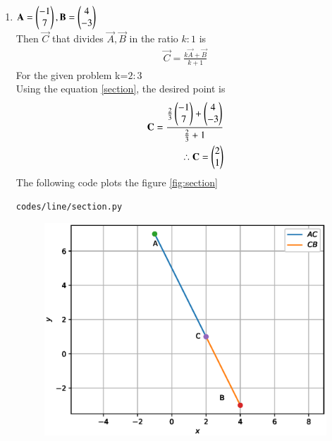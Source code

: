 \renewcommand{\theequation}{\theenumi}
\begin{enumerate}[label=\arabic*.,ref=\thesubsubsection.\theenumi]
\item  
$\mathbf{A}=\begin{pmatrix}-1\\7\end{pmatrix}, \mathbf{B}=\begin{pmatrix}4\\-3\end{pmatrix}$
\\
Then $\vec{C}$ that divides $\vec{A},\vec{B}$ in the ratio $k:1$ is
\begin{align}
\label{section}
\vec{C}=\frac{k\vec{A}+\vec{B}}{k+1}
\end{align}
For the given problem k=$2:3$
\\
Using the equation \ref{section}, the desired point is
\begin{align}
\mathbf{C}=\frac{\frac{2}{3}\begin{pmatrix}-1\\7\end{pmatrix}+\begin{pmatrix}4\\-3\end{pmatrix}}{\frac{2}{3}+1}
\\
\therefore \mathbf{C}=\begin{pmatrix}2\\1\end{pmatrix}
\end{align}
The following code plots the figure \ref{fig:section}
\begin{lstlisting}
codes/line/section.py
\end{lstlisting}
\begin{figure}[!ht]
\includegraphics[width=\columnwidth]{./figs/line/section.eps}
\caption{}
\label{fig:line_icept}
\end{figure}
\end{enumerate}